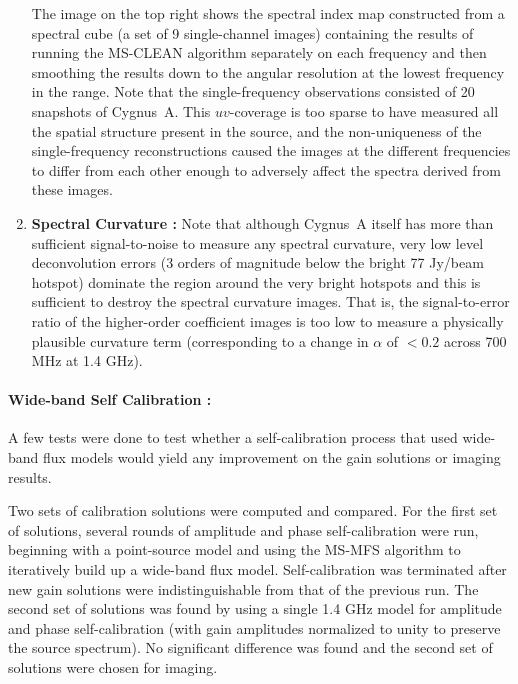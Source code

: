 \documentclass[structabstract]{stylefiles/aa}
\begin{document}
\begin{enumerate}
The image on the top right shows the spectral index map constructed from a
spectral cube (a set of 9 single-channel images) containing the results of
running the MS-CLEAN algorithm separately on each frequency and then smoothing
the results down to the angular resolution at the lowest frequency in the range.
Note that the single-frequency observations consisted of 20 snapshots of Cygnus~A.
This $uv$-coverage is too sparse to have measured all the spatial structure
present in the source, and the non-uniqueness of the single-frequency reconstructions
caused the images at the different frequencies to differ from each
other enough to adversely affect the spectra derived from these images.

\item {\bf Spectral Curvature : }
Note that although Cygnus~A itself has more than sufficient signal-to-noise to measure
any spectral curvature, very low level deconvolution errors (3 orders of magnitude below
the bright 77 Jy/beam hotspot) dominate the region around the 
very bright hotspots and this is sufficient to destroy the spectral curvature images.
That is, the signal-to-error ratio of the higher-order coefficient images
is too low to measure a physically plausible curvature
term (corresponding to a change in $\alpha$ of $<0.2$ across 700 MHz at 1.4 GHz).
\end{enumerate}

\paragraph{Wide-band Self Calibration : }

A few tests were done to test whether a self-calibration process that used 
wide-band flux models would yield any improvement on the gain solutions or
imaging results.

Two sets of calibration solutions were computed and compared.
For the first set of solutions, several rounds of amplitude and phase self-calibration were run,
beginning with a point-source model 
and using the MS-MFS algorithm to iteratively build up a wide-band flux model.
Self-calibration was terminated after new gain solutions were indistinguishable
from that of the previous run.
The second set of solutions was found by using a single 
1.4 GHz model for amplitude and phase self-calibration (with gain amplitudes
normalized to unity to preserve the source spectrum). 
No significant difference was found
and the second set of solutions were chosen for imaging. 
\end{document}
